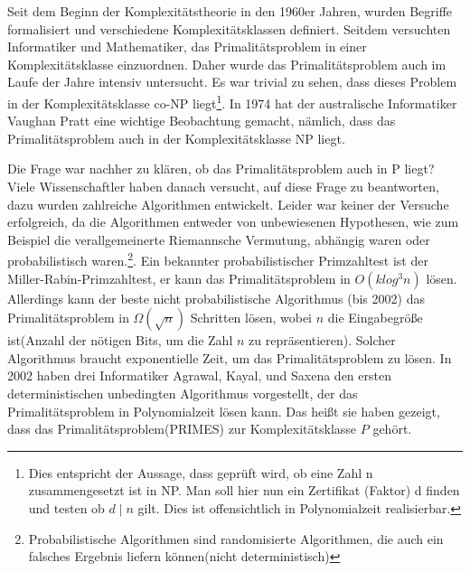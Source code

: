 \documentclass[12pt,oneside]{article}
\theoremstyle{remark}
\theoremstyle{definition}
\begin{document}
Seit dem Beginn der Komplexitätstheorie in den 1960er Jahren, wurden Begriffe formalisiert und verschiedene Komplexitätsklassen definiert\cite{com-theory}. Seitdem versuchten Informatiker und Mathematiker, das Primalitätsproblem in einer Komplexitätsklasse einzuordnen. Daher wurde das Primalitätsproblem auch im Laufe der Jahre intensiv untersucht. Es war trivial zu sehen, dass dieses Problem in der Komplexitätsklasse co-NP liegt\footnote{Dies entspricht der Aussage, dass geprüft wird, ob eine Zahl n zusammengesetzt ist in NP. Man soll hier nun ein Zertifikat (Faktor) d finden und testen ob $d \mid n$ gilt. Dies ist offensichtlich in Polynomialzeit realisierbar.\newline}. In 1974 hat der australische Informatiker Vaughan Pratt eine wichtige Beobachtung gemacht, nämlich, dass das Primalitätsproblem auch in der Komplexitätsklasse NP liegt\cite{pratt}.

Die Frage war nachher zu klären, ob das Primalitätsproblem auch in P liegt? Viele Wissenschaftler haben danach versucht, auf diese Frage zu beantworten, dazu wurden zahlreiche Algorithmen entwickelt. Leider war keiner der Versuche erfolgreich, da die Algorithmen entweder von unbewiesenen Hypothesen, wie zum Beispiel die verallgemeinerte Riemannsche Vermutung, abhängig waren oder probabilistisch waren.\footnote{Probabilistische Algorithmen sind randomisierte Algorithmen, die auch ein falsches Ergebnis liefern können(nicht deterministisch)}. Ein bekannter probabilistischer Primzahltest ist der Miller-Rabin-Primzahltest, er kann das Primalitätsproblem in $O(k log^3 n)$ lösen. Allerdings kann der beste nicht probabilistische Algorithmus (bis 2002) das Primalitätsproblem in $ \Omega(\sqrt{n}) $ Schritten lösen, wobei $n$ die Eingabegröße ist(Anzahl der nötigen Bits, um die Zahl $n$ zu repräsentieren). Solcher Algorithmus braucht exponentielle Zeit, um das Primalitätsproblem zu lösen. In 2002 haben drei Informatiker Agrawal, Kayal, und Saxena den ersten deterministischen unbedingten Algorithmus vorgestellt, der das Primalitätsproblem in Polynomialzeit lösen kann. Das heißt sie haben gezeigt, dass das Primalitätsproblem(PRIMES) zur Komplexitätsklasse $P$ gehört.      
\end{document}
